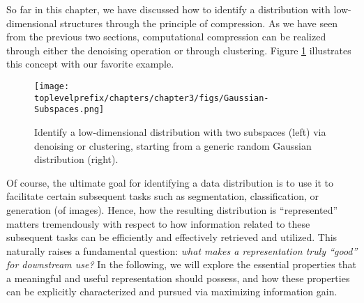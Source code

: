 \documentclass[../../book-main.tex]{subfiles}
\begin{document}

So far in this chapter, we have discussed how to identify a distribution with low-dimensional structures through the principle of compression. As we have seen from the previous two sections, computational compression can be realized through either the denoising operation or through clustering. Figure \ref{fig:Gaussian-Subspaces} illustrates this concept with our favorite example.
\begin{figure}[t]
    \centering
    \texttt{[image: \\toplevelprefix/chapters/chapter3/figs/Gaussian-Subspaces.png]}
    \caption{Identify a low-dimensional distribution with two subspaces (left) via denoising or clustering, starting from a generic random Gaussian distribution (right).}
    \label{fig:Gaussian-Subspaces}
\end{figure}
Of course, the ultimate goal for identifying a data distribution is to use it to
facilitate certain subsequent tasks such as segmentation, classification, or
generation (of images). Hence, how the resulting distribution is ``represented''
matters tremendously with respect to how information related to these subsequent tasks can be efficiently and effectively retrieved and utilized. This naturally raises a fundamental question: {\em what makes a representation truly ``good'' for downstream use?} In the following, we will explore the essential properties that a meaningful and useful representation should possess, and how these properties can be explicitly characterized and pursued via maximizing information gain.  

\end{document}
